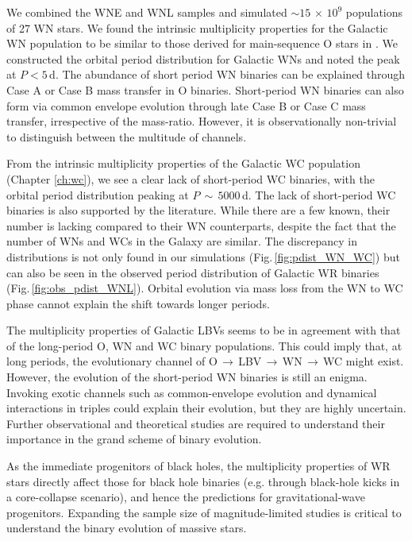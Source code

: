 We combined the WNE and WNL samples and simulated ${\sim}15\,\times\,10^9$ populations of 27 WN stars. We found the intrinsic multiplicity properties for the Galactic WN population to be similar to those derived for main-sequence O stars in \citet{sana_binary_2012}. We constructed the orbital period distribution for Galactic WNs and noted the peak at $P<5\,$d. The abundance of short period WN binaries can be explained through Case A or Case B mass transfer in O binaries. Short-period WN binaries can also form via common envelope evolution through late Case B or Case C mass transfer, irrespective of the mass-ratio. However, it is observationally non-trivial to distinguish between the multitude of channels. 

From the intrinsic multiplicity properties of the Galactic WC population (Chapter \ref{ch:wc}), we see a clear lack of short-period WC binaries, with the orbital period distribution peaking at $P\,{\sim}\,5000\,$d. The lack of short-period WC binaries is also supported by the literature. While there are a few known, their number is lacking compared to their WN counterparts, despite the fact that the number of WNs and WCs in the Galaxy are similar. The discrepancy in distributions is not only found in our simulations (Fig.\,\ref{fig:pdist_WN_WC}) but can also be seen in the observed period distribution of Galactic WR binaries (Fig.\,\ref{fig:obs_pdist_WNL}). Orbital evolution via mass loss from the WN to WC phase cannot explain the shift towards longer periods. 

The multiplicity properties of Galactic LBVs \citep{mahy_multiplicity_2022} seems to be in agreement with that of the long-period O, WN and WC binary populations. This could imply that, at long periods, the evolutionary channel of O$\,\xrightarrow{}$\,LBV\,$\xrightarrow{}$\,WN\,$\xrightarrow{}$\,WC might exist. However, the evolution of the short-period WN binaries is still an enigma. Invoking exotic channels such as common-envelope evolution and dynamical interactions in triples could explain their evolution, but they are highly uncertain. Further observational and theoretical studies are required to understand their importance in the grand scheme of binary evolution.

As the immediate progenitors of black holes, the multiplicity properties of WR stars directly affect those for black hole binaries (e.g. through black-hole kicks in a core-collapse scenario), and hence the predictions for gravitational-wave progenitors. Expanding the sample size of magnitude-limited studies is critical to understand the binary evolution of massive stars.



